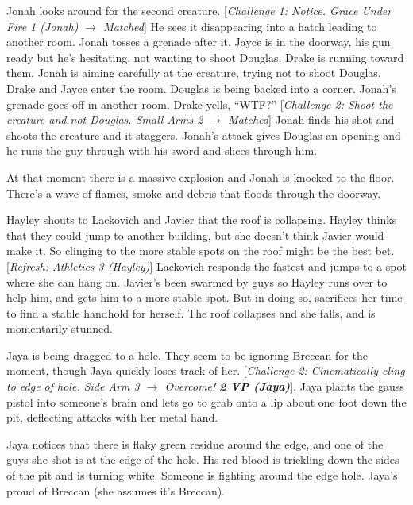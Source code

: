 Jonah looks around for the second creature.  {[}\textit{Challenge 1: Notice.  Grace Under Fire 1 (Jonah) $\rightarrow$ Matched}{]}  He sees it disappearing into a hatch leading to another room.  Jonah tosses a grenade after it.  Jayce is in the doorway, his gun ready but he's hesitating, not wanting to shoot Douglas.  Drake is running toward them.  Jonah is aiming carefully at the creature, trying not to shoot Douglas.  Drake and Jayce enter the room.  Douglas is being backed into a corner.  Jonah's grenade goes off in another room.  Drake yells, ``WTF?''  {[}\textit{Challenge 2: Shoot the creature and not Douglas.  Small Arms 2 $\rightarrow$ Matched}{]}  Jonah finds his shot and shoots the creature and it staggers.  Jonah's attack gives Douglas an opening and he runs the guy through with his sword and slices through him.



At that moment there is a massive explosion and Jonah is knocked to the floor.  There's a wave of flames, smoke and debris that floods through the doorway.





Hayley shouts to Lackovich and Javier that the roof is collapsing.  Hayley thinks that they could jump to another building, but she doesn't think Javier would make it.  So clinging to the more stable spots on the roof might be the best bet.  {[}\textit{Refresh: Athletics 3 (Hayley)}{]}  Lackovich responds the fastest and jumps to a spot where she can hang on.  Javier's been swarmed by guys so Hayley runs over to help him, and gets him to a more stable spot.  But in doing so, sacrifices her time to find a stable handhold for herself.  The roof collapses and she falls, and is momentarily stunned.



Jaya is being dragged to a hole.  They seem to be ignoring Breccan for the moment, though Jaya quickly loses track of her.  {[}\textit{Challenge 2: Cinematically cling to edge of hole.  Side Arm 3 $\rightarrow$  Overcome! }\textit{\textbf{2 VP (Jaya)}}{]}.  Jaya plants the gauss pistol into someone's brain and lets go to grab onto a lip about one foot down the pit, deflecting attacks with her metal hand.



Jaya notices that there is flaky green residue around the edge, and one of the guys she shot is at the edge of the hole.  His red blood is trickling down the sides of the pit and is turning white.  Someone is fighting around the edge hole.  Jaya's proud of Breccan (she assumes it's Breccan).



